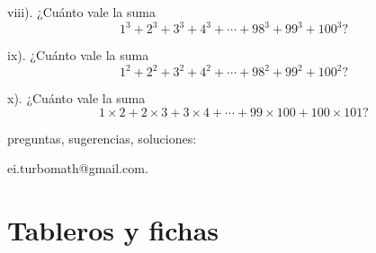 viii). ¿Cuánto vale la suma $$1^3+2^3+3^3+4^3+\cdots +98^3+99^3+100^3?$$


ix). ¿Cuánto vale la suma $$1^2+2^2+3^2+4^2+\cdots +98^2+99^2+100^2?$$


x). ¿Cuánto vale la suma $$1\times2+2\times3+3\times4+\cdots +99\times100+100\times101?$$



\vspace{.5cm}
\begin{flushright}
preguntas, sugerencias, soluciones: 

ei.turbomath@gmail.com.
\end{flushright}

\newpage

\section*{Tableros y fichas}

